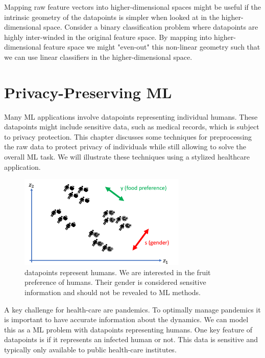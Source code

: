 \documentclass[12pt]{report}
\begin{document}
Mapping raw feature vectors into higher-dimensional spaces might be useful 
if the intrinsic geometry of the datapoints is simpler when looked at in the 
higher-dimensional space. Consider a binary classification problem where 
datapoints are highly inter-winded in the original feature space. By mapping 
into higher-dimensional feature space we might "even-out" this non-linear 
geometry such that we can use linear classifiers in the higher-dimensional space. 


\chapter{Privacy-Preserving ML}
\label{chap_privacy_preserving_ML}

Many ML applications involve datapoints representing individual humans. 
These datapoints might include sensitive data, such as medical records, 
which is subject to privacy protection. This chapter discusses some techniques 
for preprocessing the raw data to protect privacy of individuals while still allowing 
to solve the overall ML task. We will illustrate these techniques using a stylized 
healthcare application. 

\begin{figure}[htbp]
	\centering
	\includegraphics[width=8cm]{PrivacyPreservingCartoon.png}
	\caption{datapoints represent humans. We are interested in the fruit 
		preference of humans. Their gender is considered sensitive information 
		and should not be revealed to ML methods.}
	\label{fig:ppmlcartoon}
\end{figure}

A key challenge for health-care are pandemics. To optimally manage pandemics 
it is important to have accurate information about the dynamics. We can model 
this as a ML problem with datapoints representing humans. One key feature of 
datapoints is if it represents an infected human or not. This data is sensitive 
and typically only available to public health-care institutes. 
\end{document}
